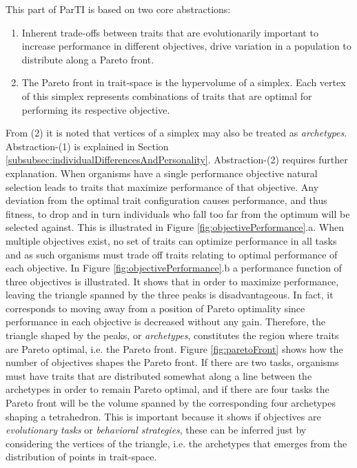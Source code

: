 This part of ParTI is based on two core abstractions:
\begin{enumerate}
	\item Inherent trade-offs between traits that are evolutionarily important to increase performance in different objectives, drive variation in a population to distribute along a Pareto front.
	\item The Pareto front in trait-space is the hypervolume of a simplex. Each vertex of this simplex represents combinations of traits that are optimal for performing its respective objective.
\end{enumerate}
From (2) it is noted that vertices of a simplex may also be treated as \textit{archetypes}. Abstraction-(1) is explained in Section \ref{subsubsec:individualDifferencesAndPersonality}. Abstraction-(2) requires further explanation. When organisms have a single performance objective natural selection leads to traits that maximize performance of that objective. Any deviation from the optimal trait configuration causes performance, and thus fitness, to drop and in turn individuals who fall too far from the optimum will be selected against. This is illustrated in Figure \ref{fig:objectivePerformance}.a. When multiple objectives exist, no set of traits can optimize performance in all tasks and as such organisms must trade off traits relating to optimal performance of each objective. In Figure \ref{fig:objectivePerformance}.b a performance function of three objectives is illustrated. It shows that in order to maximize performance, leaving the triangle spanned by the three peaks is disadvantageous. In fact, it corresponds to moving away from a position of Pareto optimality since performance in each objective is decreased without any gain. Therefore, the triangle shaped by the peaks, or \textit{archetypes}, constitutes the region where traits are Pareto optimal, i.e. the Pareto front.
Figure \ref{fig:paretoFront} shows how the number of objectives shapes the Pareto front. If there are two tasks, organisms must have traits that are distributed somewhat along a line between the archetypes in order to remain Pareto optimal, and if there are four tasks the Pareto front will be the volume spanned by the corresponding four archetypes shaping a tetrahedron.
This is important because it shows if objectives are \textit{evolutionary tasks} or \textit{behavioral strategies}, these can be inferred just by considering the vertices of the triangle, i.e. the archetypes that emerges from the distribution of points in trait-space.

